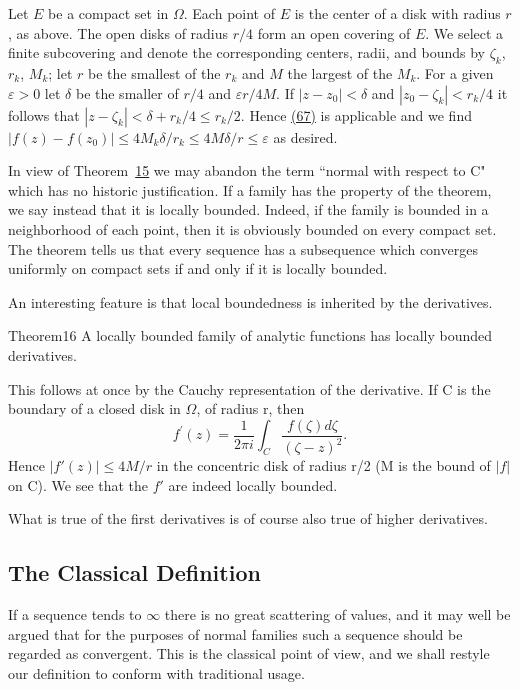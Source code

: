 Let $E$ be a compact set in $\Omega$. Each point of $E$ is the center of a disk with radius $r$, as above. The open disks of radius $r/4$ form an open covering of $E$. We select a finite subcovering and denote the corresponding centers, radii, and bounds by $\zeta_k$, $r_k$, $M_k$; let $r$ be the smallest of the $r_k$ and $M$ the largest of the $M_k$. For a given $\varepsilon > 0$ let $\delta$ be the smaller of $r/4$ and $\varepsilon r/4M$. If $|z - z_0| < \delta$ and $|z_0 - \zeta_k| < r_k/4$ it follows that $|z - \zeta_k| < \delta + r_k/4 \leq r_k/2$. Hence \hyperref[eq:5.67]{(67)} is applicable and we find $|f(z) - f(z_0)| \leq 4M_k\delta/r_k \leq 4M\delta/r \leq \varepsilon$ as desired.

In view of Theorem~\hyperref[thm:5.15]{15} we may abandon the term “normal with
respect to C" which has no historic justification. If a family has the property of the theorem, we say instead that it is locally bounded. Indeed, if the family is bounded in a neighborhood of each point, then it is obviously bounded on every compact set. The theorem tells us that every sequence has a subsequence which converges uniformly on compact sets if and only if it is locally bounded.

An interesting feature is that local boundedness is inherited by the derivatives.

\begin{originalstatement}{Theorem}{16}\label{thm:5.16}
A locally bounded family of analytic functions has locally bounded derivatives.
\end{originalstatement}
This follows at once by the Cauchy representation of the derivative. If C is the boundary of a closed disk in $\Omega$, of radius r, then
\begin{equation*}
f ^ {\prime} (z) = \frac {1}{2 \pi i} \int_ {C} \frac {f (\zeta) d \zeta}{(\zeta - z) ^ {2}}.
\end{equation*}
Hence $|f'(z)| \leq 4M/r$ in the concentric disk of radius r/2 (M is the bound of $|f|$ on C). We see that the $f'$ are indeed locally bounded.

What is true of the first derivatives is of course also true of higher derivatives.

\setcounter{section}{5}\setcounter{subsection}{4}\subsection{The Classical Definition}\label{sec:5.5.5}
If a sequence tends to $\infty$ there is no great scattering of values, and it may well be argued that for the purposes of normal families such a sequence should be regarded as convergent. This is the classical point of view, and we shall restyle our definition to conform with traditional usage.

